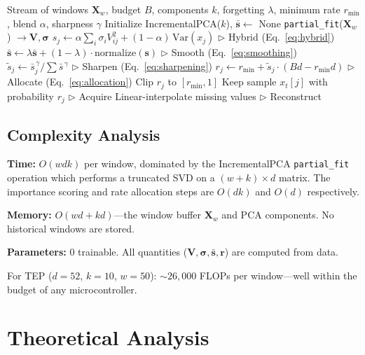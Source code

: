\documentclass[journal]{IEEEtran}
\begin{document}
\begin{algorithm}[t]
\caption{PCA-Triage}
\label{alg:pcatriage}
\begin{algorithmic}[1]
\REQUIRE Stream of windows $\mathbf{X}_w$, budget $B$, components $k$, forgetting $\lambda$, minimum rate $r_{\min}$, blend $\alpha$, sharpness $\gamma$
\STATE Initialize IncrementalPCA($k$), $\bar{\mathbf{s}} \gets$ None
  \STATE \texttt{partial\_fit}($\mathbf{X}_w$) $\to \mathbf{V}, \boldsymbol{\sigma}$
  \STATE $s_j \gets \alpha \sum_i \sigma_i V_{ij}^2 + (1{-}\alpha)\,\text{Var}(x_j)$ \hfill $\triangleright$ Hybrid (Eq.~\ref{eq:hybrid})
  \STATE $\bar{\mathbf{s}} \gets \lambda \bar{\mathbf{s}} + (1-\lambda) \cdot \text{normalize}(\mathbf{s})$ \hfill $\triangleright$ Smooth (Eq.~\ref{eq:smoothing})
  \STATE $\tilde{s}_j \gets \bar{s}_j^{\,\gamma} / \sum \bar{s}^{\,\gamma}$ \hfill $\triangleright$ Sharpen (Eq.~\ref{eq:sharpening})
  \STATE $r_j \gets r_{\min} + \tilde{s}_j \cdot (Bd - r_{\min} d)$ \hfill $\triangleright$ Allocate (Eq.~\ref{eq:allocation})
  \STATE Clip $r_j$ to $[r_{\min}, 1]$
  \STATE Keep sample $x_t[j]$ with probability $r_j$ \hfill $\triangleright$ Acquire
  \STATE Linear-interpolate missing values \hfill $\triangleright$ Reconstruct
\ENDFOR
\end{algorithmic}
\end{algorithm}

\subsection{Complexity Analysis}

\textbf{Time:} $O(wdk)$ per window, dominated by the IncrementalPCA \texttt{partial\_fit} operation which performs a truncated SVD on a $(w+k) \times d$ matrix. The importance scoring and rate allocation steps are $O(dk)$ and $O(d)$ respectively.

\textbf{Memory:} $O(wd + kd)$---the window buffer $\mathbf{X}_w$ and PCA components. No historical windows are stored.

\textbf{Parameters:} 0 trainable. All quantities ($\mathbf{V}, \boldsymbol{\sigma}, \bar{\mathbf{s}}, \mathbf{r}$) are computed from data.

For TEP ($d{=}52$, $k{=}10$, $w{=}50$): ${\sim}26{,}000$ FLOPs per window---well within the budget of any microcontroller.

\section{Theoretical Analysis}
\label{sec:theory}
\end{document}
